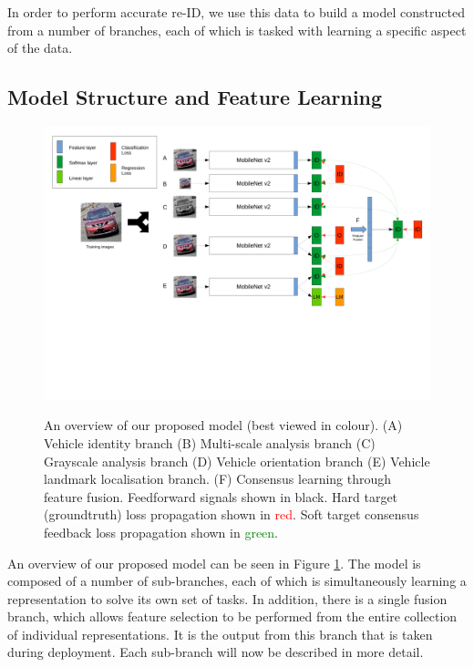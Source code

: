\documentclass[10pt,twocolumn,letterpaper]{article}
\begin{document}
In order to perform accurate re-ID, we use this data to build a model constructed from a number of branches, each of which is tasked with learning a specific aspect of the data.

\subsection{Model Structure and Feature Learning}

\begin{figure}
  \includegraphics[width=\linewidth,trim=0cm 10cm 0cm 0cm,clip=true]{images/system_overview.pdf}
  \label{F:overview}
  \caption{An overview of our proposed model (best viewed in colour). (A) Vehicle identity branch (B) Multi-scale analysis branch (C) Grayscale analysis branch (D) Vehicle orientation branch (E) Vehicle landmark localisation branch. (F) Consensus learning through feature fusion. Feedforward signals shown in black. Hard target (groundtruth) loss propagation shown in \textcolor{red}{red}. Soft target consensus feedback loss propagation shown in \textcolor{green}{green}.}
\end{figure}

An overview of our proposed model can be seen in Figure \ref{F:overview}. The model is composed of a number of sub-branches, each of which is simultaneously learning a representation to solve its own set of tasks. In addition, there is a single fusion branch, which allows feature selection to be performed from the entire collection of individual representations. It is the output from this branch that is taken during deployment. Each sub-branch will now be described in more detail.
\end{document}

